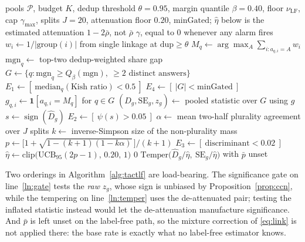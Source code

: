\documentclass{article}
\newcommand{\Dhat}{\widehat{D}}
\newcommand{\sign}{\operatorname{sign}}
\newcommand{\SC}{\textsc{sc}}
\newcommand{\TACT}{\textsc{tact}}
\begin{document}
\begin{algorithm}[t]
\caption{\TACT-LF: recovering the sign without labels}
\label{alg:tactlf}
\begin{algorithmic}[1]
\Require pools $\mathcal{P}$, budget $K$, dedup threshold $\theta{=}0.95$,
margin quantile $\beta{=}0.40$, floor $\nu_{\mathrm{LF}}$, cap $\gamma_{\max}$,
splits $J{=}20$, attenuation floor $0.20$, $\mathrm{minGated}$; $\hat\eta$ below is the
estimated attenuation $1-2\bar\rho$, not $\bar\rho$
\Ensure $\gamma$, equal to $0$ whenever any alarm fires
  \State $w_i\gets 1/|\text{group}(i)|$ from single linkage at $\mathrm{dup}\ge\theta$
  \State $M_q\gets\arg\max_A\sum_{i:a_{q,i}=A}w_i$ 
  \State $\mathrm{mgn}_q\gets$ top-two dedup-weighted share gap
\EndFor
\State $G\gets\{q:\mathrm{mgn}_q\ge Q_\beta(\mathrm{mgn}),\ \text{$\ge 2$ distinct answers}\}$
\State $E_1\gets[\ \mathrm{median}_q(\text{Kish ratio})<0.5\ ]$ 
\State $E_4\gets[\ |G|<\mathrm{minGated}\ ]$
\State $g_{q,i}\gets\mathbf{1}[a_{q,i}=M_q]$ for $q\in G$
\State $(\Dhat_g,\mathrm{SE}_g,z_g)\gets$ pooled statistic over $G$ using $g$
\State $s\gets\sign(\Dhat_g)$ 
\State $E_2\gets[\ \psi(s)>0.05\ ]$ 
\State $\alpha\gets$ mean two-half plurality agreement over $J$ splits
\State $k\gets$ inverse-Simpson size of the non-plurality mass
\State $p\gets\big[1+\sqrt{1-(k{+}1)(1-k\alpha)}\,\big]/(k{+}1)$
\State $E_3\gets[\ \text{discriminant}<0.02\ ]$ 
\State $\hat\eta\gets\mathrm{clip}\big(\mathrm{UCB}_{95}(2p-1),\,0.20,\,1\big)$
 \label{ln:gate}
  \State \Return $0$ \Comment{refuse; the vote stays \SC}
\EndIf
\State \Return $\mathrm{Temper}\big(\Dhat_g/\hat\eta,\ \mathrm{SE}_g/\hat\eta\big)$ with $\bar p$ unset \label{ln:temper}
\end{algorithmic}
\end{algorithm}

Two orderings in Algorithm~\ref{alg:tactlf} are load-bearing. The significance
gate on line~\ref{ln:gate} tests the \emph{raw} $z_g$, whose sign is unbiased by
Proposition~\ref{prop:ccn}, while the tempering on line~\ref{ln:temper} uses
the de-attenuated pair; testing the inflated statistic instead would let the
de-attenuation manufacture significance. And $\bar p$ is left unset on the
label-free path, so the mixture correction of \eqref{eq:link} is not applied
there: the base rate is exactly what no label-free estimator knows.
\end{document}
